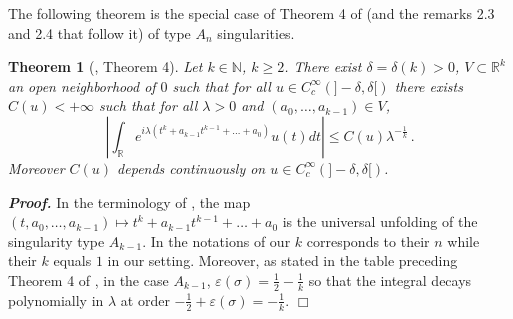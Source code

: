 \documentclass[10pt,twoside]{article}
\newcommand{\eps}{\varepsilon}
\newcommand{\R}{\mathbb{R}}
\newcommand{\N}{\mathbb{N}}
\newenvironment{prf}[1][]
{\vskip 2mm  {\it \bf Proof#1. }}{$\Box$ \vskip 2mm}
\newtheorem{theorem}{Theorem}
\numberwithin{theorem}{section}
\begin{document}
The following theorem is the special case of Theorem 4 of \cite{col77} (and the remarks 2.3 and 2.4 that follow it) of type $A_n$ singularities. 
\begin{theorem}[\cite{col77}, Theorem 4]\label{t.color.2}
Let $k\in\N$, $k\geq 2$. There exist $\delta=\delta(k)>0$, $V\subset\R^k$ an open neighborhood of $0$ such that for all $u\in C^\infty_c(]-\delta,\delta[)$ there exists $C(u)<+\infty$ such that for all $\lambda>0$ and $(a_0,\dots,a_{k-1})\in V$,
\[
\left|\int_\R e^{i\lambda(t^k+a_{k-1}t^{k-1}+\dots+a_0)}u(t)dt\right|\leq C(u)\lambda^{-\frac{1}{k}}\, .
\]
Moreover $C(u)$ depends continuously on $u\in C^\infty_c(]-\delta,\delta[)$.
\end{theorem}
\begin{prf}
In the terminology of \cite{col77}, the map $(t,a_0,\dots,a_{k-1})\mapsto t^k+a_{k-1}t^{k-1}+\dots+a_0$ is the universal unfolding of the singularity type $A_{k-1}$. In the notations of \cite{col77} our $k$ corresponds to their $n$ while their $k$ equals $1$ in our setting. Moreover, as stated in the table preceding Theorem 4 of \cite{col77}, in the case $A_{k-1}$, $\eps(\sigma)=\frac{1}{2}-\frac{1}{k}$ so that the integral decays polynomially in $\lambda$ at order $-\frac{1}{2}+\eps(\sigma)=-\frac{1}{k}$. 
\end{prf}
\end{document}
